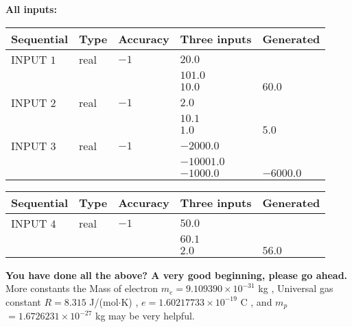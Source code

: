 \documentclass[12pt]{article}
\begin{document}
   
   
   
\noindent\vspace{0.1in}\hspace{-0.08in} {\textbf{\Large{All inputs: }}}
   
   
  
  
\noindent\begin{tabular}{|l|l|l|l|l|}
\hline
 Sequential & Type & Accuracy & Three inputs & Generated \\ 
\hline
 
 
  INPUT $            1 $ & real & $           -1  $ & $
 20.0
  $ & \\
  & & &  $
 101.0
  $ & \\
  & & &  $
 10.0
 $ & $ 60.0 $ 
 \\  \hline  
 
 
  INPUT $            2 $ & real & $           -1  $ & $
 2.0
  $ & \\
  & & &  $
 10.1
  $ & \\
  & & &  $
 1.0
 $ & $ 5.0 $ 
 \\  \hline  
 
 
  INPUT $            3 $ & real & $           -1  $ & $
 -2000.0
  $ & \\
  & & &  $
 -10001.0
  $ & \\
  & & &  $
 -1000.0
 $ & $ -6000.0 $ 
 \\  \hline  
 \end{tabular}
   
   
  
  
\noindent\begin{tabular}{|l|l|l|l|l|}
\hline
 Sequential & Type & Accuracy & Three inputs & Generated \\ 
\hline
 
 
  INPUT $            4 $ & real & $           -1  $ & $
 50.0
  $ & \\
  & & &  $
 60.1
  $ & \\
  & & &  $
 2.0
 $ & $ 56.0 $ 
 \\  \hline  
 \end{tabular}
   
   
   
   
\vspace{0.3in}
{\textbf{\LARGE{You have done all the above? A very good beginning, please go ahead.}}}
More constants the
Mass of electron
$m_e$$ =
9.109390 \times 10^{-31} $
kg
,
Universal gas constant
$R$$ =
8.315 $
J/(mol$\cdot $K)
,
$e$$ =
1.60217733 \times 10^{-19} $
C
, and
$m_p$$ =
1.6726231 \times 10^{-27} $
kg
%
may be very helpful.
\vspace{0.3in}
   
\end{document}
